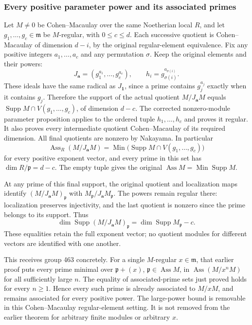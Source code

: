\subsubsection{Every positive parameter power and its associated primes}\label{every-positive-parameter-power-and-its-associated-primes}

Let \(M\ne0\) be Cohen--Macaulay over the same Noetherian local \(R\), and let \(g_1,\ldots,g_c\in\mathfrak m\) be \(M\)-regular, with \(0\le c\le d\). Each successive quotient is Cohen--Macaulay of dimension \(d-i\), by the original regular-element equivalence. Fix any positive integers \(a_1,\ldots,a_c\) and any permutation \(\sigma\). Keep the original elements and their powers: \[
 J_{\mathbf a}=(g_1^{a_1},\ldots,g_c^{a_c}),\qquad
 h_i=g_{\sigma(i)}^{a_{\sigma(i)}} .
\] These ideals have the same radical as \(J_{\mathbf 1}\), since a prime contains \(g_j^{a_j}\) exactly when it contains \(g_j\). Therefore the support of the actual quotient \(M/J_{\mathbf a}M\) equals \(\operatorname{Supp}M\cap V(g_1,\ldots,g_c)\), of dimension \(d-c\). The corrected nonzero-module parameter proposition applies to the ordered tuple \(h_1,\ldots,h_c\) and proves it regular. It also proves every intermediate quotient Cohen--Macaulay of its required dimension. All final quotients are nonzero by Nakayama. In particular \[
 \operatorname{Ass}_R(M/J_{\mathbf a}M)
 =\operatorname{Min}\bigl(\operatorname{Supp}M\cap V(g_1,\ldots,g_c)\bigr)
\] for every positive exponent vector, and every prime in this set has \(\dim R/\mathfrak p=d-c\). The empty tuple gives the original \(\operatorname{Ass}M=\operatorname{Min}\operatorname{Supp}M\).

At any prime of this final support, the original quotient and localization maps identify \((M/J_{\mathbf a}M)_{\mathfrak p}\) with \(M_{\mathfrak p}/J_{\mathbf a}M_{\mathfrak p}\). The powers remain regular there: localization preserves injectivity, and the last quotient is nonzero since the prime belongs to its support. Thus \[
 \dim\operatorname{Supp}(M/J_{\mathbf a}M)_{\mathfrak p}
 =\dim\operatorname{Supp}M_{\mathfrak p}-c .
\] These equalities retain the full exponent vector; no quotient modules for different vectors are identified with one another.

This receives group 463 concretely. For a single \(M\)-regular \(x\in\mathfrak m\), that earlier proof puts every prime minimal over \(\mathfrak p+(x)\), \(\mathfrak p\in\operatorname{Ass}M\), in \(\operatorname{Ass}(M/x^nM)\) for all sufficiently large \(n\). The equality of associated-prime sets just proved holds for every \(n\ge1\). Hence every such prime is already associated to \(M/xM\), and remains associated for every positive power. The large-power bound is removable in this Cohen--Macaulay regular-element setting. It is not removed from the earlier theorem for arbitrary finite modules or arbitrary \(x\).
